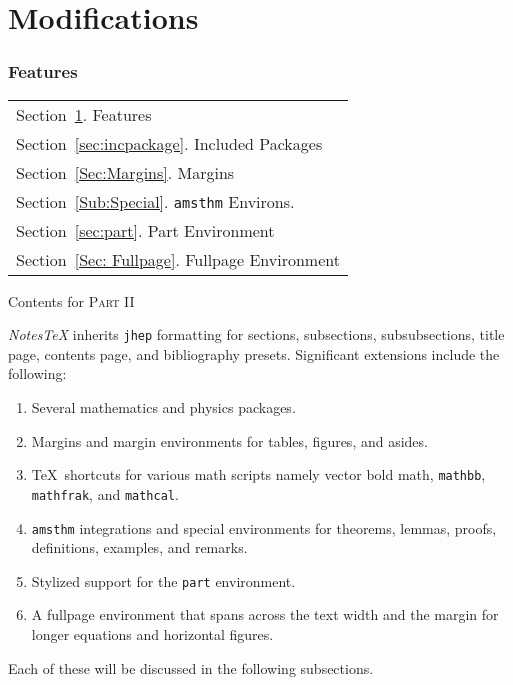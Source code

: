 \documentclass[10pt]{article}
\begin{document}
	
	\part{Modifications}\label{Part:Modification}
	\section{Features}\label{sec:Features}
	\begin{margintable}\vspace{1.4in}\footnotesize
		\begin{tabularx}{\marginparwidth}{|X}
		Section~\ref{sec:Features}. Features\\
		Section~\ref{sec:incpackage}. Included Packages\\
		Section~\ref{Sec:Margins}. Margins\\
		Section~\ref{Sub:Special}. \texttt{amsthm} Environs.\\
		Section~\ref{sec:part}. Part Environment\\
		Section~\ref{Sec: Fullpage}. Fullpage Environment\\
		\end{tabularx}
		\caption{Contents for \textsc{Part II}}
	\end{margintable}
	\textit{NotesTeX} inherits \texttt{jhep} formatting for sections, subsections, subsubsections, title page, contents page, and bibliography presets. Significant extensions include the following:
	\begin{enumerate}
		\item Several mathematics and physics packages.
		\item Margins and margin environments for tables, figures, and asides.
		\item \TeX\ shortcuts for various math scripts namely vector bold math, \texttt{mathbb}, \texttt{mathfrak}, and \texttt{mathcal}.
		\item \texttt{amsthm} integrations and special environments for theorems, lemmas, proofs, definitions, examples, and remarks.\
		\item Stylized support for the \texttt{part} environment.
		\item A fullpage environment that spans across the text width and the margin for longer equations and horizontal figures.
	\end{enumerate}
	Each of these will be discussed in the following subsections.

	\newpage
\end{document}
